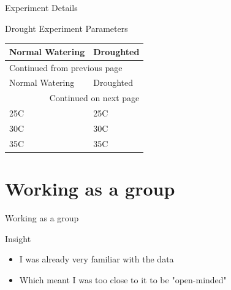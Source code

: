 \documentclass[t, aspectratio=169]{beamer}
\begin{document}
\begin{frame}[label={sec:org6220e12}]{Experiment Details}
\begin{block}{Drought Experiment Parameters}
\begin{longtable}{l|l}
\alert{Normal Watering} & \alert{Droughted}\\
\hline
\endfirsthead
\multicolumn{2}{l}{Continued from previous page} \\
\hline

\alert{Normal Watering} & \alert{Droughted} \\

\hline
\endhead
\hline\multicolumn{2}{r}{Continued on next page} \\
\endfoot
\endlastfoot
\hline
25C & 25C\\
30C & 30C\\
35C & 35C\\
\end{longtable}
\end{block}
\end{frame}


\section{Working as a group}
\label{sec:org8170c7a}
\begin{frame}[label={sec:org591928f}]{Working as a group}
\begin{block}{Insight}
\begin{itemize}
\item I was already very familiar with the data
\item Which  meant I was too close to it to be "open-minded"
\end{itemize}
\end{block}
\end{frame}
\end{document}
